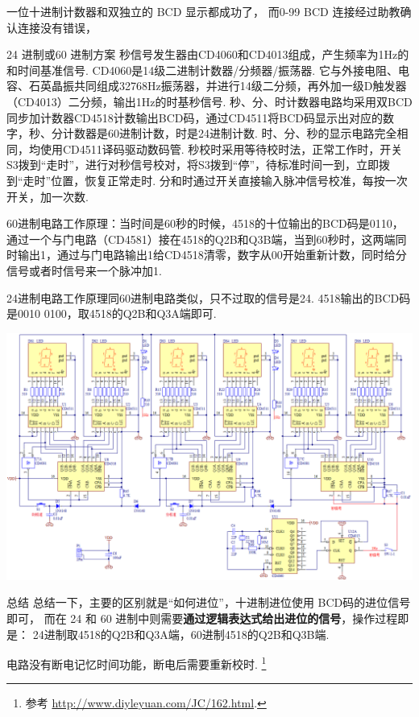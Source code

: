 \documentclass[11pt]{SEU-Digital-Report}
\begin{document}
    \begin{analyze}{}{}
      一位十进制计数器和双独立的 BCD 显示都成功了，
      而0-99 BCD 连接经过助教确认连接没有错误，
    \end{analyze}

    \begin{idea}{24 进制或60 进制方案}{}
      秒信号发生器由CD4060和CD4013组成，产生频率为1Hz的和时间基准信号. CD4060是14级二进制计数器/分频器/振荡器. 它与外接电阻、电容、石英晶振共同组成32768Hz振荡器，并进行14级二分频，再外加一级D触发器（CD4013）二分频，输出1Hz的时基秒信号. 秒、分、时计数器电路均采用双BCD同步加计数器CD4518计数输出BCD码，通过CD4511将BCD码显示出对应的数字，秒、分计数器是60进制计数，时是24进制计数. 时、分、秒的显示电路完全相同，均使用CD4511译码驱动数码管. 秒校时采用等待校时法，正常工作时，开关S3拨到“走时”，进行对秒信号校对，将S3拨到“停”，待标准时间一到，立即拨到“走时”位置，恢复正常走时. 分和时通过开关直接输入脉冲信号校准，每按一次开关，加一次数.  

60进制电路工作原理：当时间是60秒的时候，4518的十位输出的BCD码是0110，通过一个与门电路（CD4581）接在4518的Q2B和Q3B端，当到60秒时，这两端同时输出1，通过与门电路输出1给CD4518清零，数字从00开始重新计数，同时给分信号或者时信号来一个脉冲加1.  

24进制电路工作原理同60进制电路类似，只不过取的信号是24. 4518输出的BCD码是0010 0100，取4518的Q2B和Q3A端即可.  

\begin{center}
  \includegraphics[width=.8\linewidth]{fig/counter_clock.png}
\end{center}
  

\begin{idea}{总结}{}
  总结一下，主要的区别就是“如何进位”，十进制进位使用 BCD码的进位信号即可，
  而在 24 和 60 进制中则需要\textbf{通过逻辑表达式给出进位的信号}，操作过程即是：
  24进制取4518的Q2B和Q3A端，60进制4518的Q2B和Q3B端. 
\end{idea}

电路没有断电记忆时间功能，断电后需要重新校时.  
      \footnote{参考 \url{http://www.diyleyuan.com/JC/162.html}.}
    \end{idea}
\end{document}
